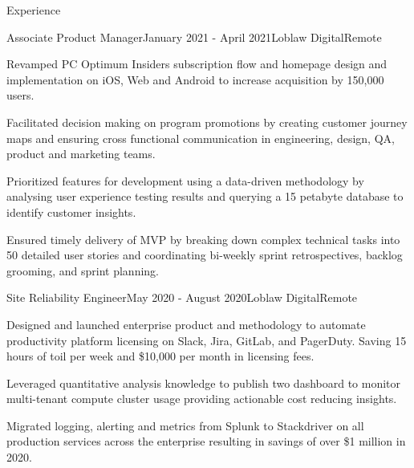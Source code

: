 \documentclass{resume} %
\begin{document}

\begin{rSection}{Experience}

\begin{rSubsection}{Associate Product Manager}{January 2021 - April 2021}{Loblaw Digital}{Remote}
\item Revamped PC Optimum Insiders subscription flow and homepage design and implementation on iOS, Web and Android to increase acquisition by 150,000 users.
\item Facilitated decision making on program promotions by creating customer journey maps and ensuring cross functional communication in engineering, design, QA, product and marketing teams. 
\item Prioritized features for development using a data-driven methodology by analysing user experience testing results and querying a 15 petabyte database to identify customer insights.
\item  Ensured timely delivery of MVP by breaking down complex technical tasks into 50 detailed user stories and coordinating bi-weekly sprint retrospectives, backlog grooming, and sprint planning.
\end{rSubsection}


\begin{rSubsection}{Site Reliability Engineer}{May 2020 - August 2020}{Loblaw Digital}{Remote}
\item Designed and launched enterprise product and methodology to automate productivity platform licensing on Slack, Jira, GitLab, and PagerDuty. Saving 15 hours of toil per week and \$10,000 per month in licensing fees. 
\item Leveraged quantitative analysis knowledge to publish two dashboard to monitor multi-tenant compute cluster usage providing actionable cost reducing insights.
\item Migrated logging, alerting and metrics from Splunk to Stackdriver on all production services across the enterprise resulting in savings of over \$1 million in 2020.
\end{rSubsection}



\end{rSection}
\end{document}

